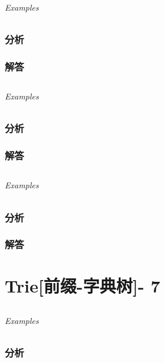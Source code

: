 \documentclass[UTF8,a4paper,12pt]{ctexbook}
\begin{document}
	\subparagraph{Examples}
	
	\subsection{分析}
	
	\subsection{解答}
	
\section{}
	
	\subparagraph{Examples}
	
	\subsection{分析}
	
	\subsection{解答}
	
\section{}
	
	\subparagraph{Examples}
	
	\subsection{分析}
	
	\subsection{解答}
\chapter{Trie[前缀-字典树]- 7}
\section{}
	
	\subparagraph{Examples}
	
	\subsection{分析}
	
\end{document}
